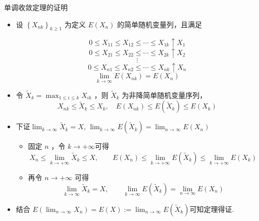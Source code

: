 	\begin{frame}[allowframebreaks]{单调收敛定理的证明}
	\begin{itemize}[<+-|alert@+>]
		\item 设 $\left\{X_{n k}\right\}_{k \geqslant 1}$ 为定义 $E\left(X_{n}\right)$ 的简单随机变量列，且满足

		\[0 \leqslant X_{11} \leqslant X_{12} \leqslant \cdots \leqslant X_{1 k} \uparrow X_{1} \]
		\[0 \leqslant X_{21} \leqslant X_{22} \leqslant \cdots \leqslant X_{2 k} \uparrow X_{2} \]
		\[\vdots\]
		\[0 \leqslant X_{n 1} \leqslant X_{n 2} \leqslant \cdots \leqslant X_{n k} \uparrow X_{n} \]
		\[\lim _{k \rightarrow \infty} E\left(X_{n k}\right)=E\left(X_{n}\right)\]

		\item 令 $\widetilde{X}_{k}=\max _{1 \leqslant i \leqslant k} X_{i k}$ ，则 $\widetilde{X}_{k}$ 为非降简单随机变量序列，
		\[
		X_{n k} \leqslant \widetilde{X}_{k} \leqslant X_{k}, \quad  E\left(X_{n k}\right) \leq E\left(\widetilde{X}_{k}\right) \leq E\left(X_{k}\right)
		\]
	\framebreak
        \item 下证$\lim _{k \rightarrow \infty} \widetilde{X}_{k}=X$, $\lim _{k \rightarrow \infty}E(\widetilde{X}_{k})=\lim_{n\rightarrow\infty}E(X_n)$

		\begin{itemize}
			\item 固定 $n$ ，令 $k \rightarrow+\infty$可得
			\[
			X_{n} \leq \lim _{k \rightarrow+\infty} \widetilde{X}_{k} \leq X, \qquad   E\left(X_{n}\right) \leq \lim _{k \rightarrow+\infty} E\left(\widetilde{X}_{k}\right) \leq \lim _{k \rightarrow+\infty}E{(X_k)}
			\]

			\item 再令 $n \rightarrow+\infty$ 可得
			\[
			\lim _{k \rightarrow \infty} \widetilde{X}_{k}=X, \qquad  \lim _{k \rightarrow \infty}E(\widetilde{X}_{k})=\lim_{n\rightarrow\infty}E(X_n)
			\]
		\end{itemize}
\item 结合 $E(\lim_{n\rightarrow\infty}X_n)=E(X):=\lim_{n\rightarrow\infty}E(\widetilde{X}_k)$可知定理得证.
	\end{itemize}

	\end{frame}


